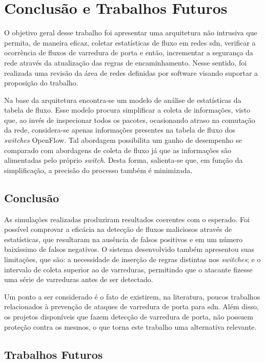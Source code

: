 \chapter{Conclusão e Trabalhos Futuros}
\label{cap:consideracoes}

O objetivo geral desse trabalho foi apresentar uma arquitetura não intrusiva que permita, de maneira eficaz, coletar estatísticas de fluxo em redes \gls{sdn}, verificar a ocorrência de fluxos de varredura de porta e então, incrementar a segurança da rede através da atualização das regras de encaminhamento. Nesse sentido, foi realizada uma revisão da área de redes definidas por software visando suportar a proposição do trabalho.

Na base da arquitetura encontra-se um modelo de análise de estatísticas da tabela de fluxo. Esse modelo procura simplificar a coleta de informações, visto que, ao invés de inspecionar todos os pacotes, ocasionando atraso na comutação da rede, considera-se apenas informações presentes na tabela de fluxo dos \textit{switches} OpenFlow. Tal abordagem possibilita um ganho de desempenho se comparado com abordagens de coleta de fluxo já que as informações são alimentadas pelo próprio \textit{switch}. Desta forma, salienta-se que, em função da simplificação, a precisão do processo também é minimizada.

\section{Conclusão}

As simulações realizadas produziram resultados coerentes com o esperado. Foi possível comprovar a eficácia na detecção de fluxos maliciosos através de estatísticas, que resultaram na ausência de falsos positivos e em um número baixíssimo de falsos negativos. O sistema desenvolvido também apresentou suas limitações, que são: a necessidade de inserção de regras distintas nos \textit{switches}; e o intervalo de coleta superior ao de varreduras, permitindo que o atacante fizesse uma série de varreduras antes de ser detectado.

Um ponto a ser considerado é o fato de existirem, na literatura, poucos trabalhos relacionados à prevenção de ataques de varredura de porta para \gls{sdn}. Além disso, os projetos disponíveis que fazem detecção de varredura de porta, não possuem proteção contra os mesmos, o que torna este trabalho uma alternativa relevante.

\section{Trabalhos Futuros}

